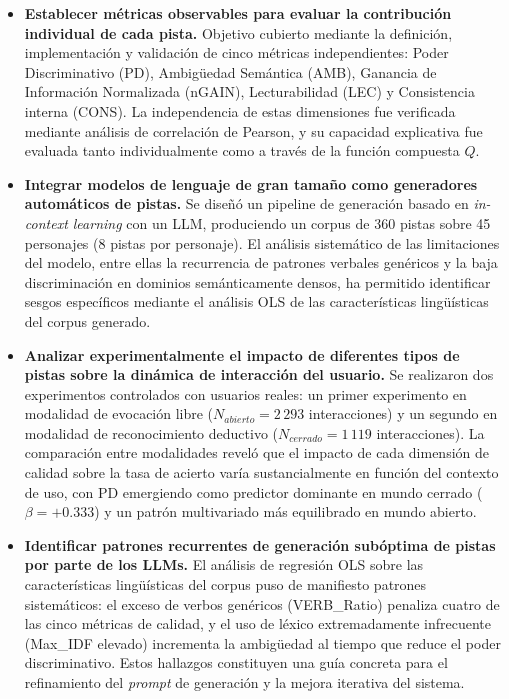 \documentclass[../main.tex]{subfiles}
\begin{document}
\begin{itemize}
    \item \textbf{Establecer métricas observables para evaluar la contribución individual de cada pista.}
    Objetivo cubierto mediante la definición, implementación y validación de cinco métricas independientes: Poder Discriminativo (PD), Ambigüedad Semántica (AMB), Ganancia de Información Normalizada (nGAIN), Lecturabilidad (LEC) y Consistencia interna (CONS). La independencia de estas dimensiones fue verificada mediante análisis de correlación de Pearson, y su capacidad explicativa fue evaluada tanto individualmente como a través de la función compuesta $Q$.

    \item \textbf{Integrar modelos de lenguaje de gran tamaño como generadores automáticos de pistas.}
    Se diseñó un pipeline de generación basado en \textit{in-context learning} con un LLM, produciendo un corpus de 360 pistas sobre 45 personajes (8 pistas por personaje). El análisis sistemático de las limitaciones del modelo, entre ellas la recurrencia de patrones verbales genéricos y la baja discriminación en dominios semánticamente densos, ha permitido identificar sesgos específicos mediante el análisis OLS de las características lingüísticas del corpus generado.

    \item \textbf{Analizar experimentalmente el impacto de diferentes tipos de pistas sobre la dinámica de interacción del usuario.}
    Se realizaron dos experimentos controlados con usuarios reales: un primer experimento en modalidad de evocación libre ($N_{abierto}=2\,293$ interacciones) y un segundo en modalidad de reconocimiento deductivo ($N_{cerrado}=1\,119$ interacciones). La comparación entre modalidades reveló que el impacto de cada dimensión de calidad sobre la tasa de acierto varía sustancialmente en función del contexto de uso, con PD emergiendo como predictor dominante en mundo cerrado ($\beta=+0.333$) y un patrón multivariado más equilibrado en mundo abierto.

    \item \textbf{Identificar patrones recurrentes de generación subóptima de pistas por parte de los LLMs.}
    El análisis de regresión OLS sobre las características lingüísticas del corpus puso de manifiesto patrones sistemáticos: el exceso de verbos genéricos (VERB\_Ratio) penaliza cuatro de las cinco métricas de calidad, y el uso de léxico extremadamente infrecuente (Max\_IDF elevado) incrementa la ambigüedad al tiempo que reduce el poder discriminativo. Estos hallazgos constituyen una guía concreta para el refinamiento del \textit{prompt} de generación y la mejora iterativa del sistema.
\end{itemize}
\end{document}
